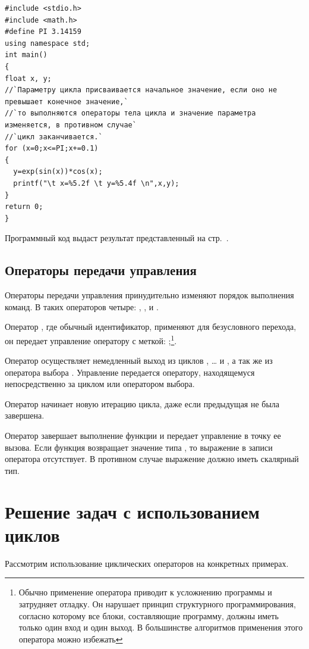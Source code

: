 \begin{lstlisting}
#include <stdio.h>
#include <math.h>
#define PI 3.14159
using namespace std;
int main()
{
float x, y;
//`Параметру цикла присваивается начальное значение, если оно не превышает конечное значение,`
//`то выполняются операторы тела цикла и значение параметра изменяется, в противном случае`
//`цикл заканчивается.`
for (x=0;x<=PI;x+=0.1)
{
  y=exp(sin(x))*cos(x);
  printf("\t x=%5.2f \t y=%5.4f \n",x,y);
}
return 0;
}
\end{lstlisting}

Программный код выдаст результат представленный на стр.~\pageref{ch03:out0}.%

\subsection[Операторы передачи управления]{Операторы передачи управления}
Операторы передачи управления принудительно изменяют порядок выполнения команд. В  таких операторов четыре:
, ,  и .

Оператор  , где  обычный идентификатор, применяют
для безусловного перехода, он передает управление оператору с меткой: 
;\footnote{Обычно применение оператора  приводит к усложнению
программы и затрудняет отладку. Он нарушает принцип структурного программирования, согласно которому все блоки,
составляющие программу, должны иметь только один вход и один выход. В большинстве алгоритмов применения этого оператора
можно избежать}.

Оператор  осуществляет немедленный выход из циклов ,
… и , а так же из оператора выбора
. Управление передается оператору, находящемуся непосредственно за циклом или оператором
выбора. 

Оператор  начинает новую итерацию цикла, даже если предыдущая не была завершена. 

Оператор   завершает выполнение функции и передает управление в
точку ее вызова. Если функция возвращает значение типа , то выражение в записи оператора
отсутствует. В противном случае выражение должно иметь скалярный тип.

\section[Решение задач с использованием циклов]{Решение задач с использованием циклов}
Рассмотрим использование циклических операторов на конкретных примерах.

